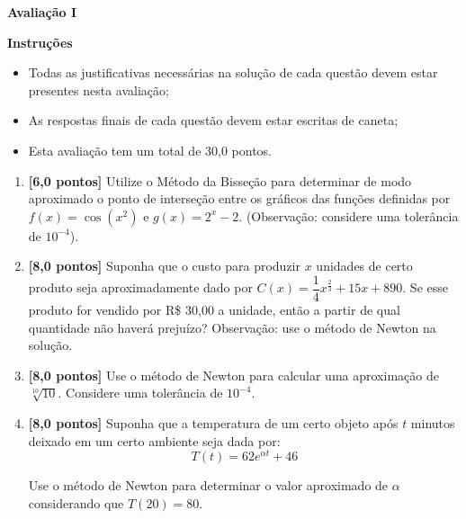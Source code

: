 \documentclass[12pt,a4paper]{article}
\begin{document}
\begin{center}
 \textbf{Avaliação I}
\end{center}

\textbf{Instruções}
\begin{itemize}
 \item Todas as justificativas necessárias na solução de cada questão devem 
 estar presentes nesta avaliação;
 \item As respostas finais de cada questão devem estar escritas de caneta;
 \item Esta avaliação tem um total de 30,0 pontos.
\end{itemize}

\begin{enumerate}
  \item \textbf{[6,0 pontos]} Utilize o Método da Bisseção para determinar de modo
  aproximado o ponto de interseção entre os gráficos das funções definidas por
  $f(x) = \cos\left(x^2\right)$ e $g(x) = 2^x - 2$. (Observação: considere uma
  tolerância de $10^{-4}$).

  \item \textbf{[8,0 pontos]} Suponha que o custo para produzir $x$ unidades de certo produto
  seja aproximadamente dado por $C(x) = \dfrac{1}{4}x^{\frac{2}{3}} + 15x + 890$. Se esse
  produto for vendido por R\$ 30,00 a unidade, então a partir de qual quantidade não
  haverá prejuízo? Observação: use o método de Newton na solução.

  \item \textbf{[8,0 pontos]} Use o método de Newton para calcular uma aproximação 
  de $\sqrt[10]{10}$. Considere uma tolerância de $10^{-4}$.

  \item \textbf{[8,0 pontos]} Suponha que a temperatura de um certo objeto após $t$ minutos deixado
  em um certo ambiente seja dada por:
  $$T(t) = 62e^{\alpha t} + 46$$
  
  Use o método de Newton para determinar o valor aproximado de $\alpha$ considerando que $T(20) = 80$.

\end{enumerate}
\end{document}
